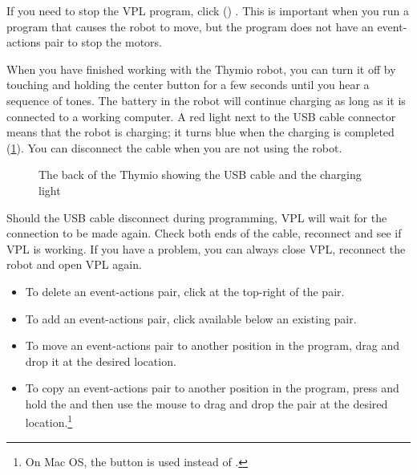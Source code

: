 
If you need to stop the VPL program, click  () .
This is important when you run a program that causes the robot to move,
but the program does not have an event-actions pair to stop the motors.


When you have finished working with the Thymio robot, you can turn it
off by touching and holding the center button for a few seconds until
you hear a sequence of tones. The battery in the robot will
continue charging as long as it is connected to a working computer. A
red light next to the USB cable connector means that the robot is
charging; it turns blue when the charging is completed (\cref{fig.back}).
You can disconnect the cable when you are not using the robot.


\begin{figure}
\begin{center}
\caption{The back of the Thymio showing the USB cable and the
 charging light}\label{fig.back}
\end{center}
\end{figure}

Should the USB cable disconnect during programming, VPL will wait for
the connection to be made again. Check both ends of the cable, reconnect
and see if VPL is working. If you have a problem, you can always close
VPL, reconnect the robot and open VPL again.



\begin{itemize}

\item To delete an event-actions pair, click  at the top-right
of the pair.

\item To add an event-actions pair, click  available below
an existing pair.

\item To move an event-actions pair to another position in the program,
drag and drop it at the desired location.

\item To copy an event-actions pair to another position in the program,
press and hold the  and then use the mouse to drag and drop the
pair at the desired location.\label{p.copy-pairs}\footnote{On Mac
OS, the  button is used instead of .}

\end{itemize}

